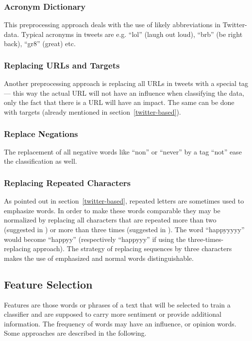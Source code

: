 \documentclass{acm_proc_article-sp}
\begin{document}
\subsubsection{Acronym Dictionary}

This preprocessing approach deals with the
use of likely abbreviations in Twitter-data.  Typical acronyms in tweets are
e.g. ``lol'' (laugh out loud), ``brb'' (be right back), ``gr8'' (great) etc.

\subsubsection{Replacing URLs and Targets}

Another preprocessing approach is
replacing all URLs in tweets with a special tag --- this way the actual URL will
not have an influence when classifying the data, only the fact that there is a
URL will have an impact.  The same can be done with targets (already mentioned
in section~\ref{twitter-based}).

\subsubsection{Replace Negations}

The replacement of all negative words like
``non'' or ``never'' by a tag ``not'' ease the classification as well.

\subsubsection{Replacing Repeated Characters}

As pointed out in
section~\ref{twitter-based}, repeated letters are sometimes used to emphasize words.
In order to make these words comparable they may be normalized
by replacing all characters that are repeated more than two
(suggested in \cite{go2009twitter}) or more than three times (suggested in
\cite{agarwal2011sentiment}). The word  ``happyyyyy'' would become ``happyy''
(respectively ``happyyy'' if using the three-times-replacing approach). The
strategy of replacing sequences by three characters makes the use of emphasized
and normal words distinguishable.

\subsection{Feature Selection}

Features are those words or phrases of a text
that will be selected to train a classifier and are  supposed to carry more
sentiment or provide additional information. The frequency of words may have
an influence, or opinion words. %
Some approaches are described in the following.
\end{document}
